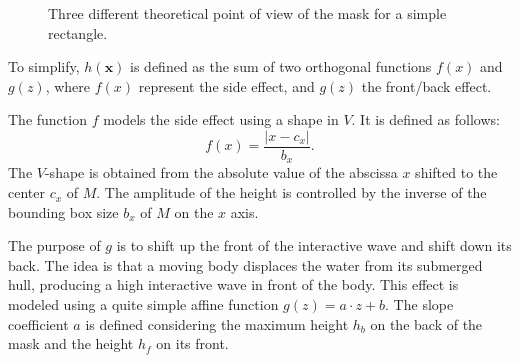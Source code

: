 \documentclass[final]{jcgt}
\begin{document}
\begin{figure}[htbp]
	\centering

	\hspace{1cm}
	\hspace{1cm}
	\caption{Three different theoretical point of view of the mask for a simple rectangle.}
	\label{fig:mask_maskTheoreticalView}
\end{figure}


To simplify, $h(\mathbf x)$ is defined as the sum of two orthogonal functions $f(x)$ and $g(z)$,
where $f(x)$ represent the side effect, and $g(z)$ the front/back effect.

The function $f$ models the side effect using a shape in $V$.
It is defined as follows:
\begin{equation}
	f(x) = \frac{\left|x-c_x\right|}{b_x}.
\end{equation}
The $V$-shape is obtained from the absolute value of the abscissa $x$ shifted to the center $c_x$ of $M$.
The amplitude of the height is controlled by the inverse of the bounding box size $b_x$ of $M$ on the $x$ axis.

The purpose of $g$ is to shift up the front of the interactive wave and shift down its back.
The idea is that a moving body displaces the water from its submerged hull, producing a high interactive wave in front of the body.
This effect is modeled using a quite simple affine function $g(z)=a\cdot z+b$.
The slope coefficient $a$ is defined considering the maximum height $h_b$ on the back of the mask and the height $h_f$ on its front.
\end{document}
